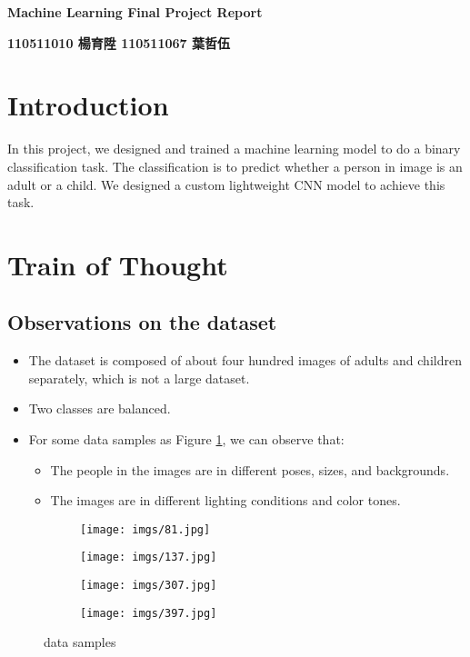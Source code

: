 \documentclass[12pt]{article}
\begin{document}
\begin{center}
    \huge \textbf{Machine Learning Final Project Report}
    
    \vspace{10pt}
    
    \large \textbf{110511010 楊育陞 110511067 葉哲伍}
\end{center}

\section{Introduction}

In this project, we designed and trained a machine learning model to do a binary classification task. The classification is to predict whether a person in image is an adult or a child. We designed a custom lightweight CNN model to achieve this task.

\section{Train of Thought}
\subsection{Observations on the dataset}

\begin{itemize}
\item The dataset is composed of about four hundred images of adults and children separately, which is not a large dataset.
\item Two classes are balanced.
\item For some data samples as Figure \ref{fig1}, we can observe that:
\begin{itemize}
\item The people in the images are in different poses, sizes, and backgrounds.
\item The images are in different lighting conditions and color tones.
\end{itemize}
\end{itemize}

\begin{figure}[h]
     \centering
     \begin{subfigure}[b]{0.23\textwidth}
         \centering
         \texttt{[image: imgs/81.jpg]}
     \end{subfigure}
     \hfill
     \begin{subfigure}[b]{0.23\textwidth}
         \centering
         \texttt{[image: imgs/137.jpg]}
     \end{subfigure}
     \hfill
     \begin{subfigure}[b]{0.23\textwidth}
         \centering
         \texttt{[image: imgs/307.jpg]}
     \end{subfigure}
     \begin{subfigure}[b]{0.23\textwidth}
         \centering
         \texttt{[image: imgs/397.jpg]}
     \end{subfigure}
    \caption{data samples}
    \label{fig1}
\end{figure}
\end{document}
